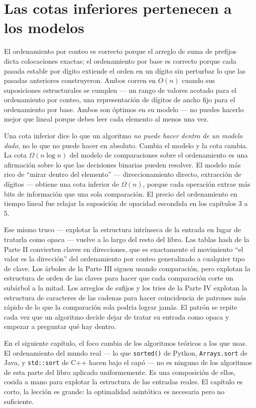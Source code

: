 \documentclass[11pt,a4paper]{article}
\begin{document}
\section{Las cotas inferiores pertenecen a los modelos}

El ordenamiento por conteo es correcto porque el arreglo de suma de prefijos dicta colocaciones exactas; el ordenamiento por base es correcto porque cada pasada estable por dígito extiende el orden en un dígito sin perturbar lo que las pasadas anteriores construyeron. Ambos corren en $O(n)$ cuando sus suposiciones estructurales se cumplen --- un rango de valores acotado para el ordenamiento por conteo, una representación de dígitos de ancho fijo para el ordenamiento por base. Ambos son óptimos en su modelo --- no puedes hacerlo mejor que lineal porque debes leer cada elemento al menos una vez.

Una cota inferior dice lo que un algoritmo \emph{no puede hacer dentro de un modelo dado}, no lo que no puede hacer en absoluto. Cambia el modelo y la cota cambia. La cota $\Omega(n \log n)$ del modelo de comparaciones sobre el ordenamiento es una afirmación sobre lo que las decisiones binarias pueden resolver. El modelo más rico de ``mirar dentro del elemento'' --- direccionamiento directo, extracción de dígitos --- obtiene una cota inferior de $\Omega(n)$, porque cada operación extrae más bits de información que una sola comparación. El precio del ordenamiento en tiempo lineal fue relajar la suposición de opacidad escondida en los capítulos 3 a 5.

Ese mismo truco --- explotar la estructura intrínseca de la entrada en lugar de tratarla como opaca --- vuelve a lo largo del resto del libro. Las tablas hash de la Parte II convierten claves en direcciones, que es exactamente el movimiento ``el valor es la dirección'' del ordenamiento por conteo generalizado a cualquier tipo de clave. Los árboles de la Parte III siguen usando comparación, pero explotan la estructura de orden de las claves para hacer que cada comparación corte un subárbol a la mitad. Los arreglos de sufijos y los tries de la Parte IV explotan la estructura de caracteres de las cadenas para hacer coincidencia de patrones más rápido de lo que la comparación sola podría lograr jamás. El patrón se repite cada vez que un algoritmo decide dejar de tratar su entrada como opaca y empezar a preguntar qué hay dentro.

En el siguiente capítulo, el foco cambia de los algoritmos teóricos a los que usas. El ordenamiento del mundo real --- lo que \texttt{sorted()} de Python, \texttt{Arrays.sort} de Java, y \texttt{std::sort} de C++ hacen bajo el capó --- no es ninguno de los algoritmos de esta parte del libro aplicado uniformemente. Es una composición de ellos, cosida a mano para explotar la estructura de las entradas reales. El capítulo es corto, la lección es grande: la optimalidad asintótica es necesaria pero no suficiente.
\end{document}
